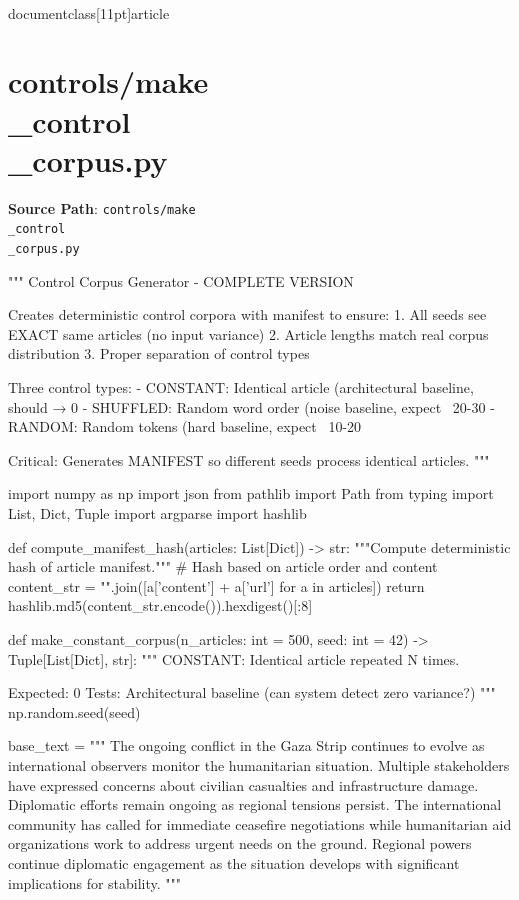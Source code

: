 \\documentclass[11pt]{article}
\begin{document}
\section*{controls/make\\_control\\_corpus.py}
\textbf{Source Path}: \texttt{controls/make\\_control\\_corpus.py}\par
\bigskip
\begin{CodeBlock}
"""
Control Corpus Generator - COMPLETE VERSION

Creates deterministic control corpora with manifest to ensure:
1. All seeds see EXACT same articles (no input variance)
2. Article lengths match real corpus distribution
3. Proper separation of control types

Three control types:
- CONSTANT: Identical article (architectural baseline, should → 0%
- SHUFFLED: Random word order (noise baseline, expect ~20-30%
- RANDOM: Random tokens (hard baseline, expect ~10-20%

Critical: Generates MANIFEST so different seeds process identical articles.
"""

import numpy as np
import json
from pathlib import Path
from typing import List, Dict, Tuple
import argparse
import hashlib


def compute_manifest_hash(articles: List[Dict]) -> str:
    """Compute deterministic hash of article manifest."""
    # Hash based on article order and content
    content_str = "".join([a['content'] + a['url'] for a in articles])
    return hashlib.md5(content_str.encode()).hexdigest()[:8]


def make_constant_corpus(n_articles: int = 500, seed: int = 42) -> Tuple[List[Dict], str]:
    """
    CONSTANT: Identical article repeated N times.
    
    Expected: 0%
    Tests: Architectural baseline (can system detect zero variance?)
    """
    np.random.seed(seed)
    
    base_text = """
    The ongoing conflict in the Gaza Strip continues to evolve as international 
    observers monitor the humanitarian situation. Multiple stakeholders have 
    expressed concerns about civilian casualties and infrastructure damage. 
    Diplomatic efforts remain ongoing as regional tensions persist. The 
    international community has called for immediate ceasefire negotiations 
    while humanitarian aid organizations work to address urgent needs on the 
    ground. Regional powers continue diplomatic engagement as the situation 
    develops with significant implications for stability.
    """
    

\end{CodeBlock}
\end{document}
